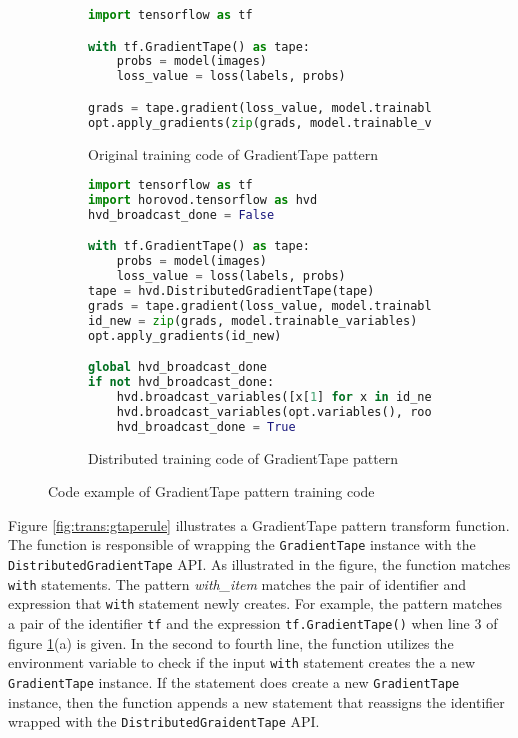 \begin{figure}[ht!]
  \centering
  \begin{subfigure}[t]{0.45\textwidth}
    \begin{lstlisting}[language=Python]
import tensorflow as tf

with tf.GradientTape() as tape:
    probs = model(images)
    loss_value = loss(labels, probs)

grads = tape.gradient(loss_value, model.trainable_variables)
opt.apply_gradients(zip(grads, model.trainable_variables))
    \end{lstlisting}
    \caption{Original training code of GradientTape pattern}
  \end{subfigure}
  \hspace{5mm}
  \begin{subfigure}[t]{0.45\textwidth}
    \begin{lstlisting}[language=Python]
import tensorflow as tf
import horovod.tensorflow as hvd
hvd_broadcast_done = False

with tf.GradientTape() as tape:
    probs = model(images)
    loss_value = loss(labels, probs)
tape = hvd.DistributedGradientTape(tape)
grads = tape.gradient(loss_value, model.trainable_variables)
id_new = zip(grads, model.trainable_variables)
opt.apply_gradients(id_new)

global hvd_broadcast_done
if not hvd_broadcast_done:
    hvd.broadcast_variables([x[1] for x in id_new], root_rank=0, )
    hvd.broadcast_variables(opt.variables(), root_rank=0, )
    hvd_broadcast_done = True
    \end{lstlisting}
    \caption{Distributed training code of GradientTape pattern}
  \end{subfigure}
  \caption{Code example of GradientTape pattern training code}
  \label{fig:trans:gtapetrans}
\end{figure}

Figure \ref{fig:trans:gtaperule} illustrates a GradientTape pattern
transform function.
The function is responsible of wrapping the
{\tt GradientTape} instance with the {\tt DistributedGradientTape} API.
As illustrated in the figure, the function matches {\tt with} statements.
The pattern \textit{with\_item} matches the pair of identifier and expression 
that {\tt with} statement newly creates. 
For example, the pattern matches a pair of the identifier {\tt tf} and the 
expression {\tt tf.GradientTape()} when line 3 of figure 
\ref{fig:trans:gtapetrans}(a) is given.
In the second to fourth line, the function utilizes the environment variable  
to check if the input {\tt with} statement creates the a new {\tt GradientTape}
instance.
If the statement does create a new {\tt GradientTape} instance,
then the function appends a new statement that reassigns the identifier
wrapped with the {\tt DistributedGraidentTape} API.

